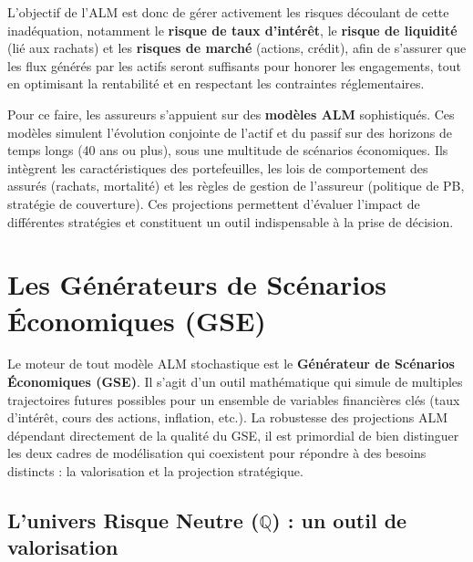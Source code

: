 \bigskip

L'objectif de l'ALM est donc de gérer activement les risques découlant de cette inadéquation, notamment le \textbf{risque de taux d'intérêt}, le \textbf{risque de liquidité} (lié aux rachats) et les \textbf{risques de marché} (actions, crédit), afin de s'assurer que les flux générés par les actifs seront suffisants pour honorer les engagements, tout en optimisant la rentabilité et en respectant les contraintes réglementaires.

\bigskip

Pour ce faire, les assureurs s'appuient sur des \textbf{modèles ALM} sophistiqués. Ces modèles simulent l'évolution conjointe de l'actif et du passif sur des horizons de temps longs (40 ans ou plus), sous une multitude de scénarios économiques. Ils intègrent les caractéristiques des portefeuilles, les lois de comportement des assurés (rachats, mortalité) et les règles de gestion de l'assureur (politique de PB, stratégie de couverture). Ces projections permettent d'évaluer l'impact de différentes stratégies et constituent un outil indispensable à la prise de décision.

\section{Les Générateurs de Scénarios Économiques (GSE)}
\label{sec:gse}

Le moteur de tout modèle ALM stochastique est le \textbf{Générateur de Scénarios Économiques (GSE)}. Il s'agit d'un outil mathématique qui simule de multiples trajectoires futures possibles pour un ensemble de variables financières clés (taux d'intérêt, cours des actions, inflation, etc.). La robustesse des projections ALM dépendant directement de la qualité du GSE, il est primordial de bien distinguer les deux cadres de modélisation qui coexistent pour répondre à des besoins distincts : la valorisation et la projection stratégique.

\subsection{L'univers Risque Neutre ($\mathbb{Q}$) : un outil de valorisation}

